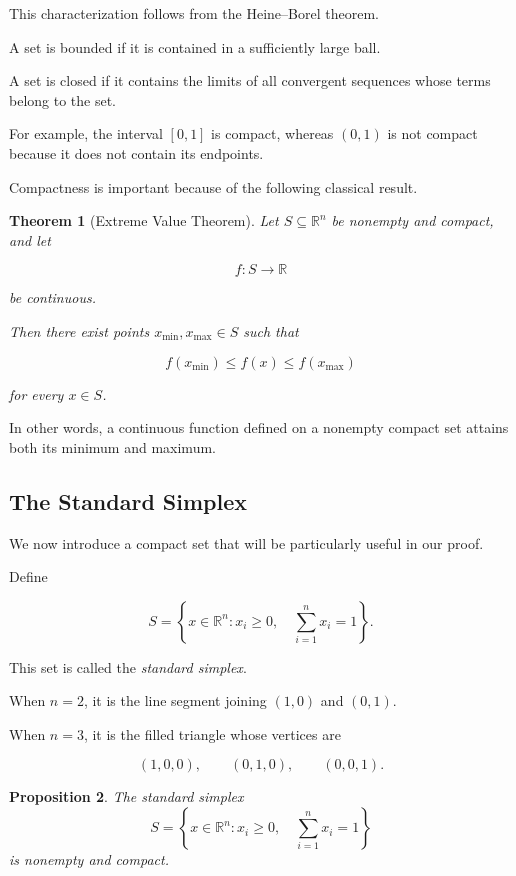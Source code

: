 \documentclass[11pt,a4paper]{article}
\newtheorem{theorem}{Theorem}[section]
\newtheorem{proposition}[theorem]{Proposition}
\theoremstyle{definition}
\theoremstyle{remark}
\begin{document}
This characterization follows from
the Heine--Borel theorem.

A set is bounded if it is contained
in a sufficiently large ball.

A set is closed if it contains
the limits of all convergent
sequences whose terms belong
to the set.

For example, the interval $[0,1]$
is compact, whereas $(0,1)$
is not compact because it
does not contain its endpoints.

Compactness is important because
of the following classical result.

\begin{theorem}[Extreme Value Theorem]

Let $S\subseteq\mathbb{R}^n$
be nonempty and compact, and let

\[
f:S\longrightarrow\mathbb{R}
\]

be continuous.

Then there exist points
$x_{\min},x_{\max}\in S$ such that

\[
f(x_{\min})
\leq f(x)
\leq f(x_{\max})
\]

for every $x\in S$.

\end{theorem}

In other words, a continuous function
defined on a nonempty compact set
attains both its minimum and maximum.


\subsection{The Standard Simplex}

We now introduce a compact set
that will be particularly useful
in our proof.

Define

\begin{equation}
S=
\left\{
x\in\mathbb{R}^n:
x_i\geq0,\quad
\sum_{i=1}^{n}x_i=1
\right\}.
\label{eq:standard_simplex}
\end{equation}

This set is called the
\emph{standard simplex}.

When $n=2$, it is the line segment
joining $(1,0)$ and $(0,1)$.

When $n=3$, it is the filled
triangle whose vertices are

\[
(1,0,0),\qquad
(0,1,0),\qquad
(0,0,1).
\]

\begin{proposition}
The standard simplex
\[
S=
\left\{
x\in\mathbb{R}^n:
x_i\geq0,\quad
\sum_{i=1}^{n}x_i=1
\right\}
\]
is nonempty and compact.
\end{proposition}
\end{document}
